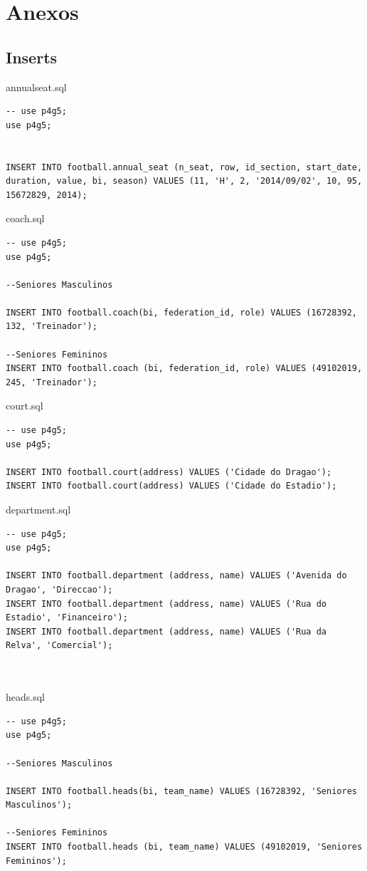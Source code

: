 \documentclass[pdftex,12pt,a4paper]{report}
\begin{document}
\newpage
\section{Anexos}
\subsection*{Inserts}
annual{\textunderscore}seat.sql
\begin{lstlisting} 
-- use p4g5;
use p4g5;


INSERT INTO football.annual_seat (n_seat, row, id_section, start_date, duration, value, bi, season) VALUES (11, 'H', 2, '2014/09/02', 10, 95, 15672829, 2014);

\end{lstlisting}

coach.sql
\begin{lstlisting} 
-- use p4g5;
use p4g5;

--Seniores Masculinos

INSERT INTO football.coach(bi, federation_id, role) VALUES (16728392, 132, 'Treinador');

--Seniores Femininos
INSERT INTO football.coach (bi, federation_id, role) VALUES (49102019, 245, 'Treinador');
\end{lstlisting}

court.sql
\begin{lstlisting} 
-- use p4g5;
use p4g5;

INSERT INTO football.court(address) VALUES ('Cidade do Dragao');
INSERT INTO football.court(address) VALUES ('Cidade do Estadio');

\end{lstlisting}

department.sql
\begin{lstlisting} 
-- use p4g5;
use p4g5;

INSERT INTO football.department (address, name) VALUES ('Avenida do Dragao', 'Direccao');
INSERT INTO football.department (address, name) VALUES ('Rua do Estadio', 'Financeiro');
INSERT INTO football.department (address, name) VALUES ('Rua da Relva', 'Comercial');



\end{lstlisting}

heads.sql
\begin{lstlisting} 
-- use p4g5;
use p4g5;

--Seniores Masculinos

INSERT INTO football.heads(bi, team_name) VALUES (16728392, 'Seniores Masculinos');

--Seniores Femininos
INSERT INTO football.heads (bi, team_name) VALUES (49102019, 'Seniores Femininos');
\end{lstlisting}
\end{document}
